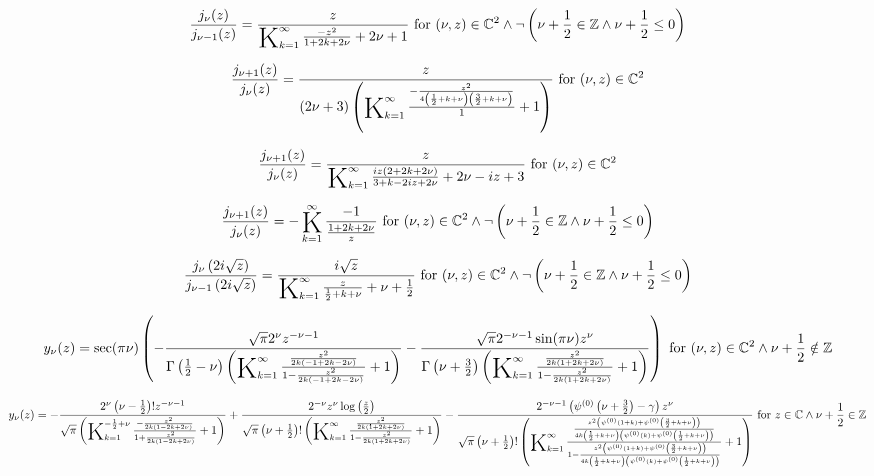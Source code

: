 \documentclass{article}
\newcommand{\bigK}{\mathop{\raisebox{-5pt}{\huge K}}}
\begin{document}
\[\frac{j_{\nu }(z)}{j_{\nu -1}(z)}=\frac{z}{\bigK_{k=1}^{\infty}\frac{-z^2}{1+2 k+2 \nu }+2 \nu +1}\text{ for }(\nu ,z)\in \mathbb{C}^2\land \neg \left(\nu +\frac{1}{2}\in \mathbb{Z}\land \nu +\frac{1}{2}\leq 0\right)\] 

\[\frac{j_{\nu +1}(z)}{j_{\nu }(z)}=\frac{z}{(2 \nu +3) \left(\bigK_{k=1}^{\infty}\frac{-\frac{z^2}{4 \left(\frac{1}{2}+k+\nu \right) \left(\frac{3}{2}+k+\nu \right)}}{1}+1\right)}\text{ for }(\nu ,z)\in \mathbb{C}^2\] 

\[\frac{j_{\nu +1}(z)}{j_{\nu }(z)}=\frac{z}{\bigK_{k=1}^{\infty}\frac{i z (2+2 k+2 \nu )}{3+k-2 i z+2 \nu }+2 \nu -i z+3}\text{ for }(\nu ,z)\in \mathbb{C}^2\] 

\[\frac{j_{\nu +1}(z)}{j_{\nu }(z)}=-\bigK_{k=1}^{\infty}\frac{-1}{\frac{1+2 k+2 \nu }{z}}\text{ for }(\nu ,z)\in \mathbb{C}^2\land \neg \left(\nu +\frac{1}{2}\in \mathbb{Z}\land \nu +\frac{1}{2}\leq 0\right)\] 

\[\frac{j_{\nu }\left(2 i \sqrt{z}\right)}{j_{\nu -1}\left(2 i \sqrt{z}\right)}=\frac{i \sqrt{z}}{\bigK_{k=1}^{\infty}\frac{z}{\frac{1}{2}+k+\nu }+\nu +\frac{1}{2}}\text{ for }(\nu ,z)\in \mathbb{C}^2\land \neg \left(\nu +\frac{1}{2}\in \mathbb{Z}\land \nu +\frac{1}{2}\leq 0\right)\] 

\[y_{\nu }(z)=\sec (\pi  \nu ) \left(-\frac{\sqrt{\pi } 2^{\nu } z^{-\nu -1}}{\Gamma \left(\frac{1}{2}-\nu \right) \left(\bigK_{k=1}^{\infty}\frac{\frac{z^2}{2 k (-1+2 k-2 \nu )}}{1-\frac{z^2}{2 k (-1+2 k-2 \nu )}}+1\right)}-\frac{\sqrt{\pi } 2^{-\nu -1} \sin (\pi  \nu ) z^{\nu }}{\Gamma \left(\nu +\frac{3}{2}\right) \left(\bigK_{k=1}^{\infty}\frac{\frac{z^2}{2 k (1+2 k+2 \nu )}}{1-\frac{z^2}{2 k (1+2 k+2 \nu )}}+1\right)}\right)\text{ for }(\nu ,z)\in \mathbb{C}^2\land \nu +\frac{1}{2}\notin \mathbb{Z}\] 

\[y_{\nu }(z)=-\frac{2^{\nu } \left(\nu -\frac{1}{2}\right)! z^{-\nu -1}}{\sqrt{\pi } \left(\bigK_{k=1}^{-\frac{1}{2}+\nu}\frac{-\frac{z^2}{2 k (1-2 k+2 \nu )}}{1+\frac{z^2}{2 k (1-2 k+2 \nu )}}+1\right)}+\frac{2^{-\nu } z^{\nu } \log \left(\frac{z}{2}\right)}{\sqrt{\pi } \left(\nu +\frac{1}{2}\right)! \left(\bigK_{k=1}^{\infty}\frac{\frac{z^2}{2 k (1+2 k+2 \nu )}}{1-\frac{z^2}{2 k (1+2 k+2 \nu )}}+1\right)}-\frac{2^{-\nu -1} \left(\psi ^{(0)}\left(\nu +\frac{3}{2}\right)-\gamma \right) z^{\nu }}{\sqrt{\pi } \left(\nu +\frac{1}{2}\right)! \left(\bigK_{k=1}^{\infty}\frac{\frac{z^2 \left(\psi ^{(0)}(1+k)+\psi ^{(0)}\left(\frac{3}{2}+k+\nu \right)\right)}{4 k \left(\frac{1}{2}+k+\nu \right) \left(\psi ^{(0)}(k)+\psi ^{(0)}\left(\frac{1}{2}+k+\nu \right)\right)}}{1-\frac{z^2 \left(\psi ^{(0)}(1+k)+\psi ^{(0)}\left(\frac{3}{2}+k+\nu \right)\right)}{4 k \left(\frac{1}{2}+k+\nu \right) \left(\psi ^{(0)}(k)+\psi ^{(0)}\left(\frac{1}{2}+k+\nu \right)\right)}}+1\right)}\text{ for }z\in \mathbb{C}\land \nu +\frac{1}{2}\in \mathbb{Z}\] 
\end{document}
